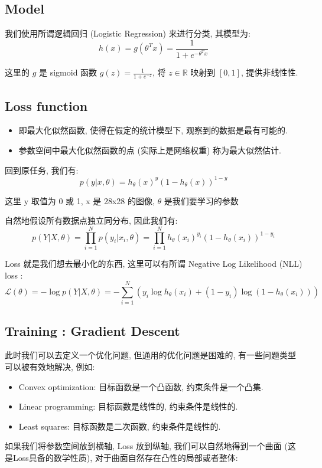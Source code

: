 \subsection{Model}
我们使用所谓逻辑回归 (Logistic Regression) 来进行分类, 其模型为:
$$h(x) = g(\theta^T x) = \frac{1}{1 + e^{-\theta^T x}}$$
\begin{note}
    这里的 $g$ 是 sigmoid 函数 $g(z) = \frac{1}{1 + e^{-z}}$, 将 $z\in \mathbb{R}$ 映射到 $[0, 1]$, 提供非线性性.
\end{note}
\subsection{Loss function}
\begin{definition}[最大似然估计]
    \begin{itemize}
        \item 即最大化似然函数, 使得在假定的统计模型下, 观察到的数据是最有可能的.
        \item 参数空间中最大化似然函数的点 (实际上是网络权重) 称为最大似然估计.
    \end{itemize}
\end{definition}
回到原任务, 我们有:
$$ p(y|x, \theta) = h_{\theta}(x)^y (1 - h_{\theta}(x))^{1-y} $$
\begin{note}
    这里 y 取值为 0 或 1, x 是 28x28 的图像, $\theta$ 是我们要学习的参数
\end{note}
自然地假设所有数据点独立同分布, 因此我们有:
$$ p(Y|X, \theta) = \prod_{i=1}^N p(y_i|x_i, \theta) = \prod_{i=1}^N h_{\theta}(x_i)^{y_i} (1 - h_{\theta}(x_i))^{1-y_i} $$

Loss 就是我们想去最小化的东西, 这里可以有所谓 Negative Log Likelihood (NLL) loss :
$$ \mathcal{L}({\theta}) = -\log p(Y|X, \theta) = -\sum_{i=1}^N \left( y_i \log h_{\theta}(x_i) + (1 - y_i) \log (1 - h_{\theta}(x_i)) \right) $$
\clearpage
\subsection{Training : Gradient Descent}
此时我们可以去定义一个优化问题, 但通用的优化问题是困难的, 有一些问题类型可以被有效地解决, 例如:
\begin{itemize}
    \item Convex optimization: 目标函数是一个凸函数, 约束条件是一个凸集.
    \item Linear programming: 目标函数是线性的, 约束条件是线性的.
    \item Least squares: 目标函数是二次函数, 约束条件是线性的.
\end{itemize}
如果我们将参数空间放到横轴, Loss 放到纵轴, 我们可以自然地得到一个曲面 (这是Loss具备的数学性质), 对于曲面自然存在凸性的局部或者整体:


